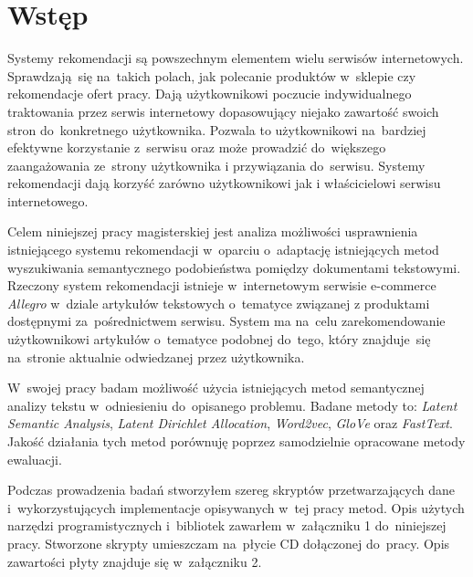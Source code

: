 \documentclass[pl]{minipw} %
\begin{document}
\makestatement


\cleardoublepage
\tableofcontents


\cleardoublepage
\pagestyle{fancy}

\chapter*{Wstęp}
Systemy rekomendacji są powszechnym elementem wielu serwisów internetowych. Sprawdzają~się na~takich polach, jak polecanie produktów w~sklepie czy rekomendacje ofert pracy. Dają użytkownikowi poczucie indywidualnego traktowania przez serwis internetowy dopasowujący niejako zawartość swoich stron do~konkretnego użytkownika. Pozwala to użytkownikowi na~bardziej efektywne korzystanie z~serwisu oraz może prowadzić do~większego zaangażowania ze~strony użytkownika i przywiązania do~serwisu. Systemy rekomendacji dają korzyść zarówno użytkownikowi jak i właścicielowi serwisu internetowego.

Celem niniejszej pracy magisterskiej jest analiza możliwości usprawnienia istniejącego systemu rekomendacji w~oparciu o~adaptację istniejących metod wyszukiwania semantycznego podobieństwa pomiędzy dokumentami tekstowymi. Rzeczony system rekomendacji istnieje w~internetowym serwisie e-commerce \textit{Allegro} w~dziale artykułów tekstowych o~tematyce związanej z produktami dostępnymi za~pośrednictwem serwisu. System ma na~celu zarekomendowanie użytkownikowi artykułów o~tematyce podobnej do~tego, który znajduje~się na~stronie aktualnie odwiedzanej przez użytkownika.

W~swojej pracy badam możliwość użycia istniejących metod semantycznej analizy tekstu w~odniesieniu do~opisanego problemu. Badane metody to: \textit{Latent Semantic Analysis}, \textit{Latent Dirichlet Allocation}, \textit{Word2vec}, \textit{GloVe} oraz \textit{FastText}. Jakość działania tych metod porównuję poprzez samodzielnie opracowane metody ewaluacji.

Podczas prowadzenia badań stworzyłem szereg skryptów przetwarzających dane i~wykorzystujących implementacje opisywanych w~tej pracy metod. Opis użytych narzędzi programistycznych i~bibliotek zawarłem w~załączniku 1 do~niniejszej pracy. Stworzone skrypty umieszczam na~płycie CD dołączonej do~pracy. Opis zawartości płyty znajduje się w~załączniku 2.
\end{document}

